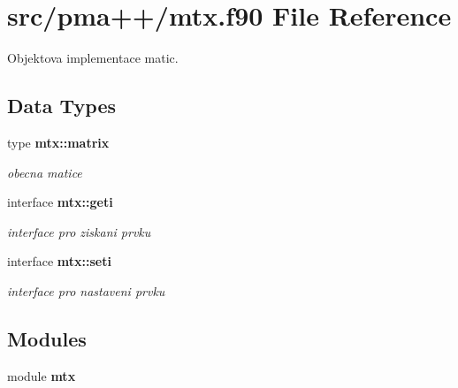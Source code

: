 \section{src/pma++/mtx.f90 File Reference}
\label{mtx_8f90}


Objektova implementace matic.  


\subsection*{Data Types}
\begin{DoxyCompactItemize}
\item 
type {\bf mtx\+::matrix}
\begin{DoxyCompactList}\small\item\em obecna matice \end{DoxyCompactList}\item 
interface {\bf mtx\+::geti}
\begin{DoxyCompactList}\small\item\em interface pro ziskani prvku \end{DoxyCompactList}\item 
interface {\bf mtx\+::seti}
\begin{DoxyCompactList}\small\item\em interface pro nastaveni prvku \end{DoxyCompactList}\end{DoxyCompactItemize}
\subsection*{Modules}
\begin{DoxyCompactItemize}
\item 
module {\bf mtx}
\end{DoxyCompactItemize}
